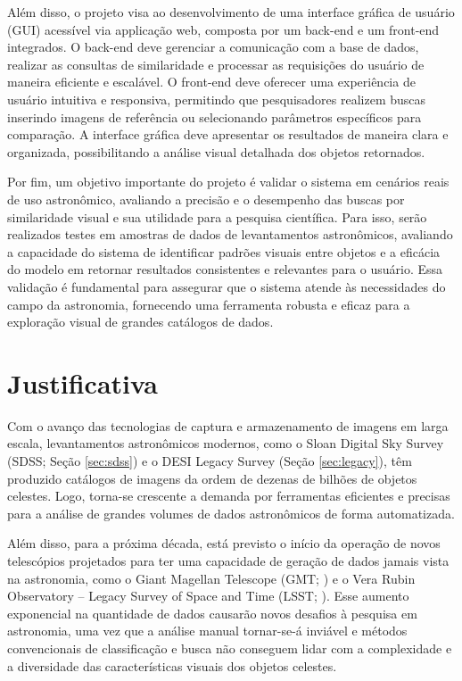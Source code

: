 Além disso, o projeto visa ao desenvolvimento de uma interface gráfica de usuário (GUI) acessível via applicação web, composta por um back-end e um front-end integrados. O back-end deve gerenciar a comunicação com a base de dados, realizar as consultas de similaridade e processar as requisições do usuário de maneira eficiente e escalável. O front-end deve oferecer uma experiência de usuário intuitiva e responsiva, permitindo que pesquisadores realizem buscas inserindo imagens de referência ou selecionando parâmetros específicos para comparação. A interface gráfica deve apresentar os resultados de maneira clara e organizada, possibilitando a análise visual detalhada dos objetos retornados.

Por fim, um objetivo importante do projeto é validar o sistema em cenários reais de uso astronômico, avaliando a precisão e o desempenho das buscas por similaridade visual e sua utilidade para a pesquisa científica. Para isso, serão realizados testes em amostras de dados de levantamentos astronômicos, avaliando a capacidade do sistema de identificar padrões visuais entre objetos e a eficácia do modelo em retornar resultados consistentes e relevantes para o usuário. Essa validação é fundamental para assegurar que o sistema atende às necessidades do campo da astronomia, fornecendo uma ferramenta robusta e eficaz para a exploração visual de grandes catálogos de dados.


\section{Justificativa}
\label{sec:justificativa}

Com o avanço das tecnologias de captura e armazenamento de imagens em larga escala, levantamentos astronômicos modernos, como o Sloan Digital Sky Survey (SDSS; Seção \ref{sec:sdss}) e o DESI Legacy Survey (Seção \ref{sec:legacy}), têm produzido catálogos de imagens da ordem de dezenas de bilhões de objetos celestes. Logo, torna-se crescente a demanda por ferramentas eficientes e precisas para a análise de grandes volumes de dados astronômicos de forma automatizada.

Além disso, para a próxima década, está previsto o início da operação de novos telescópios projetados para ter uma capacidade de geração de dados jamais vista na astronomia, como o Giant Magellan Telescope (GMT; \citealp{gmt}) e o Vera Rubin Observatory -- Legacy Survey of Space and Time (LSST; \citealp{lsst}). Esse aumento exponencial na quantidade de dados causarão novos desafios à pesquisa em astronomia, uma vez que a análise manual tornar-se-á inviável e métodos convencionais de classificação e busca não conseguem lidar com a complexidade e a diversidade das características visuais dos objetos celestes.

